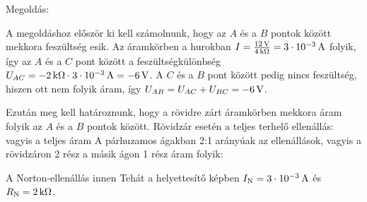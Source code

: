 
\ifdefined\megoldas

 Megoldás: 

 A megoldáshoz először ki kell számolnunk, hogy az $A$ és a $B$ pontok között mekkora feszültség esik. Az áramkörben a hurokban $I=\frac{12\mathrm{\, V}}{4\mathrm{\, k\Omega}}=3\cdot 10^{-3}\mathrm{\, A}$ folyik, így az $A$ és a $C$ pont között a feszültségkülönbség $U_{AC}=-2\mathrm{\, k\Omega}\cdot 3\cdot 10^{-3}\mathrm{\, A}=-6\mathrm{\, V}$. A $C$ és a $B$ pont között pedig nincs feszültség, hiszen ott nem folyik áram, így $U_{AB}=U_{AC}+U_{BC}=-6\mathrm{\, V}$.

 Ezután meg kell határoznunk, hogy a rövidre zárt áramkörben mekkora áram folyik az $A$ és a $B$ pontok között. Rövidzár esetén a teljes terhelő ellenállás:
 vagyis a teljes áram
 A párhuzamos ágakban 2:1 arányúak az ellenállások, vagyis a rövidzáron 2 rész a másik ágon 1 rész áram folyik:

 A Norton-ellenállás innen
 Tehát a helyettesítő képben $I_\text{N}=3\cdot 10^{-3}\mathrm{\, A}$ és $R_\text{N}=2\mathrm{\, k\Omega}$.

\fi